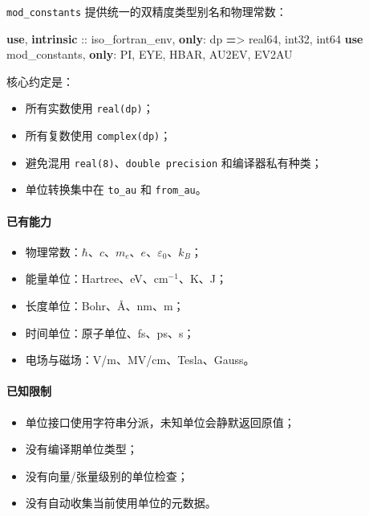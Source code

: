 \documentclass[
]{ctexbook}
\newenvironment{Shaded}{}{}
\newcommand{\DataTypeTok}[1]{\textcolor[rgb]{0.56,0.13,0.00}{#1}}
\newcommand{\KeywordTok}[1]{\textcolor[rgb]{0.00,0.44,0.13}{\textbf{#1}}}
\newcommand{\NormalTok}[1]{#1}
\newcommand{\OperatorTok}[1]{\textcolor[rgb]{0.40,0.40,0.40}{#1}}
\providecommand{\tightlist}{%
  \setlength{\itemsep}{0pt}\setlength{\parskip}{0pt}}
\begin{document}
\texttt{mod\_constants} 提供统一的双精度类型别名和物理常数：

\begin{Shaded}
\begin{Highlighting}[]
\KeywordTok{use}\NormalTok{, }\KeywordTok{intrinsic} \DataTypeTok{::}\NormalTok{ iso\_fortran\_env, }\KeywordTok{only}\NormalTok{: dp }\KeywordTok{=}\OperatorTok{\textgreater{}}\NormalTok{ real64, int32, int64}
\KeywordTok{use}\NormalTok{ mod\_constants, }\KeywordTok{only}\NormalTok{: PI, EYE, HBAR, AU2EV, EV2AU}
\end{Highlighting}
\end{Shaded}

核心约定是：

\begin{itemize}
\tightlist
\item
  所有实数使用 \texttt{real(dp)}；
\item
  所有复数使用 \texttt{complex(dp)}；
\item
  避免混用 \texttt{real(8)}、\texttt{double\ precision}
  和编译器私有种类；
\item
  单位转换集中在 \texttt{to\_au} 和 \texttt{from\_au}。
\end{itemize}

\hypertarget{ux5df2ux6709ux80fdux529b}{%
\paragraph{已有能力}\label{ux5df2ux6709ux80fdux529b}}

\begin{itemize}
\tightlist
\item
  物理常数：\(\hbar\)、\(c\)、\(m_e\)、\(e\)、\(\varepsilon_0\)、\(k_B\)；
\item
  能量单位：Hartree、eV、\(\mathrm{cm^{-1}}\)、K、J；
\item
  长度单位：Bohr、Å、nm、m；
\item
  时间单位：原子单位、fs、ps、s；
\item
  电场与磁场：V/m、MV/cm、Tesla、Gauss。
\end{itemize}

\hypertarget{ux5df2ux77e5ux9650ux5236}{%
\paragraph{已知限制}\label{ux5df2ux77e5ux9650ux5236}}

\begin{itemize}
\tightlist
\item
  单位接口使用字符串分派，未知单位会静默返回原值；
\item
  没有编译期单位类型；
\item
  没有向量/张量级别的单位检查；
\item
  没有自动收集当前使用单位的元数据。
\end{itemize}
\end{document}
